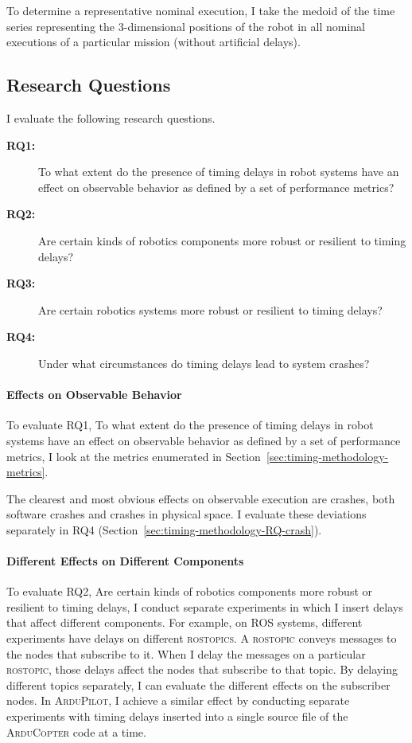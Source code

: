 \documentclass[conference]{IEEEtran}
\newcommand{\tool}[1]{\textsc{#1}}
\begin{document}
To determine a representative nominal execution, I take the medoid of the time series representing the 3-dimensional positions of the robot in all nominal executions of a particular mission (without artificial delays).

\subsection{Research Questions}
\label{sec:timing-research-questions}
I evaluate the following research questions.
\begin{description}
\item[\textbf{RQ1:}] To what extent do the presence of timing delays in robot systems have an effect on observable behavior as defined by a set of performance metrics?
\item[\textbf{RQ2:}] Are certain kinds of robotics components more robust or resilient to timing delays?
\item[\textbf{RQ3:}]  Are certain robotics systems more robust or resilient to timing delays?
\item[\textbf{RQ4:}] Under what circumstances do timing delays lead to system crashes?
\end{description}

\paragraph{Effects on Observable Behavior}
\label{sec:timing-methodology-RQ-observable}

To evaluate RQ1, To what extent do the presence of timing delays in robot systems have an effect on observable behavior as defined by a set of performance metrics, I look at the metrics enumerated in Section~\ref{sec:timing-methodology-metrics}.

The clearest and most obvious effects on observable execution are crashes, both software crashes and crashes in physical space.
I evaluate these deviations separately in RQ4 (Section~\ref{sec:timing-methodology-RQ-crash}).

\paragraph{Different Effects on Different Components}

To evaluate RQ2, Are certain kinds of robotics components more robust or resilient to timing delays, 
I conduct separate experiments in which I insert delays that affect different 
components. 
For example, on \tool{ROS} systems, different experiments have delays on different 
\tool{rostopics}. 
A \tool{rostopic} conveys messages to the nodes that subscribe to it. 
When I delay the messages on a particular \tool{rostopic}, those delays affect the 
nodes that subscribe to that topic. 
By delaying different topics separately, I can evaluate the different effects on the subscriber nodes. 
In \tool{ArduPilot}, I achieve a similar effect by conducting separate experiments with timing delays inserted into a single source file of the \tool{ArduCopter} code at a time.
\end{document}
